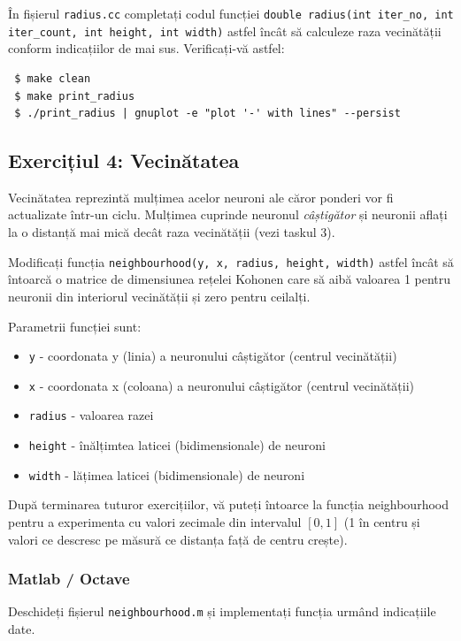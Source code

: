 \documentclass[12pt]{article}%
\newcommand{\mat}{{\color{brightmaroon} Matlab / Octave}}
\begin{document}
În fișierul \texttt{radius.cc} completați codul funcției
\texttt{double radius(int iter\_no, int iter\_count, int height, int
  width)} astfel încât să calculeze raza vecinătății conform
indicațiilor de mai sus. Verificați-vă astfel:

\begin{verbatim}
 $ make clean
 $ make print_radius
 $ ./print_radius | gnuplot -e "plot '-' with lines" --persist
\end{verbatim}

\subsection{Exercițiul 4: Vecinătatea}
\label{sec:task4}

Vecinătatea reprezintă mulțimea acelor neuroni ale căror ponderi vor
fi actualizate într-un ciclu. Mulțimea cuprinde neuronul
\emph{câștigător} și neuronii aflați la o distanță mai mică decât raza
vecinătății (vezi taskul 3).

Modificați funcția \texttt{neighbourhood(y, x, radius, height, width)}
astfel încât să întoarcă o matrice de dimensiunea rețelei Kohonen care
să aibă valoarea 1 pentru neuronii din interiorul vecinătății și zero
pentru ceilalți.

Parametrii funcției sunt:
\begin{itemize}
\item \texttt{y} - coordonata y (linia) a neuronului câștigător
  (centrul vecinătății)
\item \texttt{x} - coordonata x (coloana) a neuronului câștigător
  (centrul vecinătății)
\item \texttt{radius} - valoarea razei
\item \texttt{height} - înălțimtea laticei (bidimensionale) de neuroni
\item \texttt{width} - lățimea laticei (bidimensionale) de neuroni
\end{itemize}

După terminarea tuturor exercițiilor, vă puteți întoarce la funcția
neighbourhood pentru a experimenta cu valori zecimale din intervalul
$[0,1]$ (1 în centru și valori ce descresc pe măsură ce distanța față
de centru crește).

\subsubsection*{\mat}
\label{sec:mat4}

Deschideți fișierul \texttt{neighbourhood.m} și implementați funcția
urmând indicațiile date.
\end{document}
